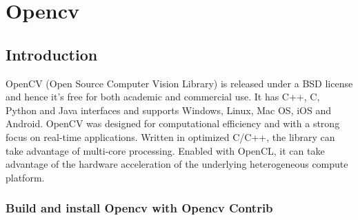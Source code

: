 
\chapter{Opencv}

\section{Introduction }
OpenCV (Open Source Computer Vision Library) is released under a BSD license and hence it’s free for both academic and commercial use. It has C++, C, Python and Java interfaces and supports Windows, Linux, Mac OS, iOS and Android. OpenCV was designed for computational efficiency and with a strong focus on real-time applications. Written in optimized C/C++, the library can take advantage of multi-core processing. Enabled with OpenCL, it can take advantage of the hardware acceleration of the underlying heterogeneous compute platform. 
\subsection{Build and install Opencv with Opencv Contrib}

